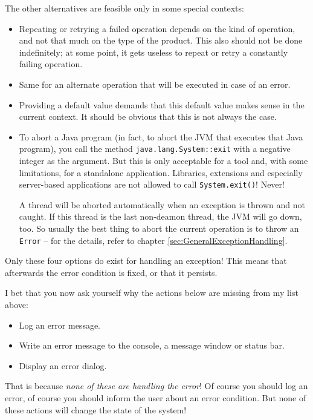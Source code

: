 \documentclass[11pt,a4paper, titlepage, parskip=half, headsepline, footsepline, cleardoublepage=current, headheight=1cm]{scrbook}
\newcommand*{\tqref}[1]{\hyperref[{#1}]{\ref*{#1}}}
\begin{document}
The other alternatives are feasible only in some special contexts:
\begin{itemize}
\item{Repeating or retrying a failed operation depends on the kind of operation, and not that much on the type of the product. This also should not be done indefinitely; at some point, it gets useless to repeat or retry a constantly failing operation.}

\item{Same for an alternate operation that will be executed in case of an error.}

\item{Providing a default value demands that this default value makes sense in the current context. It should be obvious that this is not always the case.}

\item{To abort a Java program (in fact, to abort the JVM that executes that Java program), you call the method \lstinline|java.lang.System::exit|\autocite{ORACLE_DOC_SYSTEM:exit} with a negative integer as the argument. But this is only acceptable for a tool and, with some limitations, for a standalone application. Libraries, extensions and especially server-based applications are not allowed to call \lstinline|System.exit()|! Never!

A thread will be aborted automatically when an exception is thrown and not caught. If this thread is the last non-deamon thread, the JVM will go down, too. So usually the best thing to abort the current operation is to throw an \lstinline|Error| – for the details, refer to chapter \tqref{sec:GeneralExceptionHandling}.}
\end{itemize}

Only these four options do exist for handling an exception! This means that afterwards the error condition is fixed, or that it persists.

I bet that you now ask yourself why the actions below are missing from my list above:
\begin{itemize}
\item{Log an error message.}
\item{Write an error message to the console, a message window or status bar.}
\item{Display an error dialog.}
\end{itemize}

That is because \textit{none of these are handling the error}! Of course you should log an error, of course you should inform the user about an error condition. But none of these actions will change the state of the system!
\end{document}
